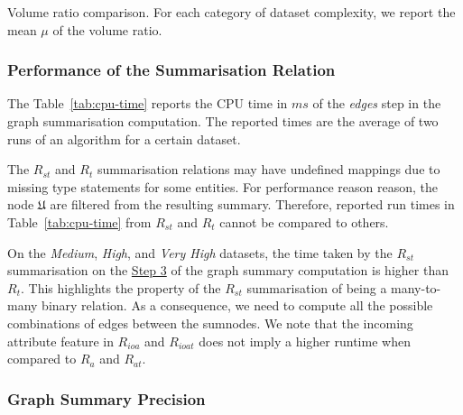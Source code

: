 \begin{table}
	\centering
	
	\caption{Volume ratio comparison. For each category of dataset complexity, we report the mean $\mu$ of the volume ratio.}
	\label{tab:volume-ratio}
\end{table}

\subsubsection{Performance of the Summarisation Relation}

The Table~\ref{tab:cpu-time} reports the CPU time in $ms$ of the \emph{edges} step in the graph summarisation computation. The reported times are the average of two runs of an algorithm for a certain dataset.

The $R_{st}$ and $R_t$ summarisation relations may have undefined mappings due to missing type statements for some entities. For performance reason reason, the node $\mathfrak{U}$ are filtered from the resulting summary. Therefore, reported run times in Table~\ref{tab:cpu-time} from $R_{st}$ and $R_t$ cannot be compared to others.

On the \emph{Medium}, \emph{High}, and \emph{Very High} datasets, the time taken by the $R_{st}$ summarisation on the \hyperref[step-he]{Step 3} of the graph summary computation is higher than $R_t$. This highlights the property of the $R_{st}$ summarisation of being a many-to-many binary relation. As a consequence, we need to compute all the possible combinations of edges between the sumnodes.
We note that the incoming attribute feature in $R_{ioa}$ and $R_{ioat}$ does not imply a higher runtime when compared to $R_{a}$ and $R_{at}$.

\begin{table}
	\centering
	\resizebox{\textwidth}{!}{
		
	}
	\caption{Performance comparison. We report the CPU time in $ms$ of the \emph{edges} step in the graph summarisation computation. For each category of dataset complexity, we report the mean $\mu$ of the CPU time.%
	}
	\label{tab:cpu-time}
\end{table}

\subsubsection{Graph Summary Precision}

